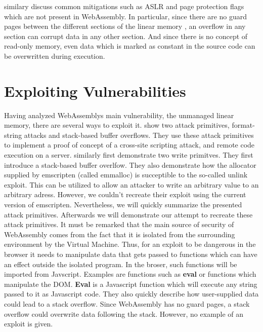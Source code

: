 \documentclass[sigconf]{acmart}
\begin{document}
\cite{lehmann_everything_2020} similary discuss common mitigations such as ASLR and page protection flags which are not present in WebAssembly. In particular, since there are no guard pages between the different sections of the linear memory , an overflow in any section can corrupt data in any other section. And since there is no concept of read-only memory, even data which is marked as constant in the source code can be overwritten during execution.  

\section{Exploiting Vulnerabilities}
Having analyzed WebAssemblys main vulnerability, the unmanaged linear memory, there are several ways to exploit it.  \cite{mcfadden_security_2018} show two attack primitives, format-string attacks and stack-based buffer overflows. They use these attack primitives to implement a proof of concept of a cross-site scripting attack, and remote code execution on a server.
\cite{lehmann_everything_2020} similarly first demonstrate two write primitves. They first introduce a stack-based buffer overlfow. They also demonstrate how the allocator supplied by emscripten (called emmalloc) is succeptible to the so-called unlink exploit. This can be utilized to allow an attacker to write an arbitrary value to an arbitrary adress. However, we couldn't recreate their exploit using the current version of emscripten. 
Nevertheless, we will quickly summarize the presented attack primitives. Afterwards we will demonstrate our attempt to recreate these attack primitives. It must be remarked that the main source of security of WebAssembly comes from the fact that it is isolated from the surrounding environment by the Virtual Machine. Thus, for an exploit to be dangerous in the browser it needs to manipulate data that gets passed to functions which can have an effect outside the isolated program. In the broser, such functions will be imported from Javscript. Examples are functions such as \textbf{eval} or functions which manipulate the DOM.
\textbf{Eval} is a Javascript function which will execute any string passed to it as Javascript code. They also quickly describe how user-supplied data could lead to a stack overflow. Since WebAssembly has no guard pages, a stack overflow could overwrite data following the stack. However, no example of an exploit is given. 
\end{document}
